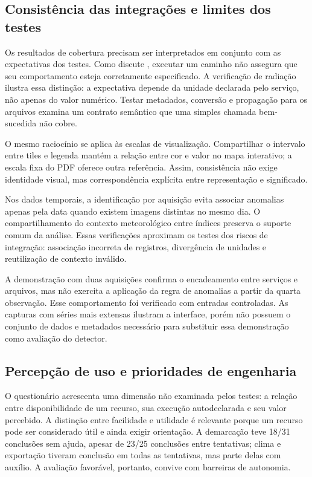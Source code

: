 \subsection{Consistência das integrações e limites dos testes}

Os resultados de cobertura precisam ser interpretados em conjunto com as expectativas dos testes. Como discute \citet{BENDER2020}, executar um caminho não assegura que seu comportamento esteja corretamente especificado. A verificação de radiação ilustra essa distinção: a expectativa depende da unidade declarada pelo serviço, não apenas do valor numérico. Testar metadados, conversão e propagação para os arquivos examina um contrato semântico que uma simples chamada bem-sucedida não cobre.

O mesmo raciocínio se aplica às escalas de visualização. Compartilhar o intervalo entre tiles e legenda mantém a relação entre cor e valor no mapa interativo; a escala fixa do PDF oferece outra referência. Assim, consistência não exige identidade visual, mas correspondência explícita entre representação e significado.

Nos dados temporais, a identificação por aquisição evita associar anomalias apenas pela data quando existem imagens distintas no mesmo dia. O compartilhamento do contexto meteorológico entre índices preserva o suporte comum da análise. Essas verificações aproximam os testes dos riscos de integração: associação incorreta de registros, divergência de unidades e reutilização de contexto inválido.

A demonstração com duas aquisições confirma o encadeamento entre serviços e arquivos, mas não exercita a aplicação da regra de anomalias a partir da quarta observação. Esse comportamento foi verificado com entradas controladas. As capturas com séries mais extensas ilustram a interface, porém não possuem o conjunto de dados e metadados necessário para substituir essa demonstração como avaliação do detector.

\subsection{Percepção de uso e prioridades de engenharia}

O questionário acrescenta uma dimensão não examinada pelos testes: a relação entre disponibilidade de um recurso, sua execução autodeclarada e seu valor percebido. A distinção entre facilidade e utilidade \citep{DAVIS1989} é relevante porque um recurso pode ser considerado útil e ainda exigir orientação. A demarcação teve 18/31 conclusões sem ajuda, apesar de 23/25 conclusões entre tentativas; clima e exportação tiveram conclusão em todas as tentativas, mas parte delas com auxílio. A avaliação favorável, portanto, convive com barreiras de autonomia.

